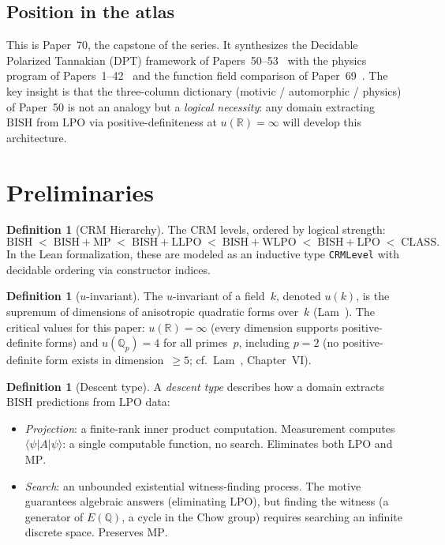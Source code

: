 \documentclass[11pt]{article}
\theoremstyle{definition}
\newtheorem{definition}[theorem]{Definition}
\theoremstyle{remark}
\newcommand{\Q}{\mathbb{Q}}
\newcommand{\R}{\mathbb{R}}
\newcommand{\Qp}{\Q_p}
\newcommand{\BISH}{\mathrm{BISH}}
\newcommand{\LPO}{\mathrm{LPO}}
\newcommand{\WLPO}{\mathrm{WLPO}}
\newcommand{\LLPO}{\mathrm{LLPO}}
\newcommand{\MP}{\mathrm{MP}}
\newcommand{\CLASS}{\mathrm{CLASS}}
\begin{document}
\subsection{Position in the atlas}

This is Paper~70, the capstone of the series. It synthesizes the Decidable Polarized Tannakian (DPT) framework of Papers~50--53~\cite{Paper50} with the physics program of Papers~1--42~\cite{Paper40} and the function field comparison of Paper~69~\cite{Paper69}. The key insight is that the three-column dictionary (motivic / automorphic / physics) of Paper~50 is not an analogy but a \emph{logical necessity}: any domain extracting $\BISH$ from $\LPO$ via positive-definiteness at $u(\R) = \infty$ will develop this architecture.

\section{Preliminaries}
\label{sec:prelim}

\begin{definition}[CRM Hierarchy]
The CRM levels, ordered by logical strength:
\[
\BISH \;<\; \BISH + \MP \;<\; \BISH + \LLPO \;<\; \BISH + \WLPO \;<\; \BISH + \LPO \;<\; \CLASS.
\]
In the Lean formalization, these are modeled as an inductive type \texttt{CRMLevel} with decidable ordering via constructor indices.
\end{definition}

\begin{definition}[$u$-invariant]
The $u$-invariant of a field~$k$, denoted $u(k)$, is the supremum of dimensions of anisotropic quadratic forms over~$k$ (Lam~\cite{Lam}). The critical values for this paper: $u(\R) = \infty$ (every dimension supports positive-definite forms) and $u(\Qp) = 4$ for all primes~$p$, including $p = 2$ (no positive-definite form exists in dimension~$\geq 5$; cf.\ Lam~\cite{Lam}, Chapter~VI).
\end{definition}

\begin{definition}[Descent type]
A \emph{descent type} describes how a domain extracts $\BISH$ predictions from $\LPO$ data:
\begin{itemize}
\item \emph{Projection}: a finite-rank inner product computation. Measurement computes $\langle \psi | A | \psi \rangle$: a single computable function, no search. Eliminates both $\LPO$ and $\MP$.
\item \emph{Search}: an unbounded existential witness-finding process. The motive guarantees algebraic answers (eliminating $\LPO$), but finding the witness (a generator of $E(\Q)$, a cycle in the Chow group) requires searching an infinite discrete space. Preserves $\MP$.
\end{itemize}
\end{definition}
\end{document}
